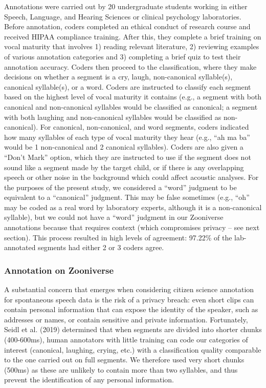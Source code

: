 \documentclass[english,,man,floatsintext]{apa6}
\begin{document}
Annotations were carried out by 20 undergraduate students working in either Speech, Language, and Hearing Sciences or clinical psychology laboratories. Before annotation, coders completed an ethical conduct of research course and received HIPAA compliance training. After this, they complete a brief training on vocal maturity that involves 1) reading relevant literature, 2) reviewing examples of various annotation categories and 3) completing a brief quiz to test their annotation accuracy. Coders then proceed to the classification, where they make decisions on whether a segment is a cry, laugh, non-canonical syllable(s), canonical syllable(s), or a word. Coders are instructed to classify each segment based on the highest level of vocal maturity it contains (e.g., a segment with both canonical and non-canonical syllables would be classified as canonical; a segment with both laughing and non-canonical syllables would be classified as non-canonical). For canonical, non-canonical, and word segments, coders indicated how many syllables of each type of vocal maturity they hear (e.g., \enquote{ah ma ba} would be 1 non-canonical and 2 canonical syllables). Coders are also given a \enquote{Don't Mark} option, which they are instructed to use if the segment does not sound like a segment made by the target child, or if there is any overlapping speech or other noise in the background which could affect acoustic analyses. For the purposes of the present study, we considered a \enquote{word} judgment to be equivalent to a \enquote{canonical} judgment. This may be false sometimes (e.g., \enquote{oh} may be coded as a real word by laboratory experts, although it is a non-canonical syllable), but we could not have a \enquote{word} judgment in our Zooniverse annotations because that requires context (which compromises privacy -- see next section). This process resulted in high levels of agreement: 97.22\% of the lab-annotated segments had either 2 or 3 coders agree.

\hypertarget{annotation-on-zooniverse}{%
\subsubsection{Annotation on Zooniverse}\label{annotation-on-zooniverse}}

A substantial concern that emerges when considering citizen science annotation for spontaneous speech data is the risk of a privacy breach: even short clips can contain personal information that can expose the identity of the speaker, such as addresses or names, or contain sensitive and private information. Fortunately, Seidl et al. (2019) determined that when segments are divided into shorter chunks (400-600ms), human annotators with little training can code our categories of interest (canonical, laughing, crying, etc.) with a classification quality comparable to the one carried out on full segments. We therefore used very short chunks (500ms) as these are unlikely to contain more than two syllables, and thus prevent the identification of any personal information.
\end{document}
